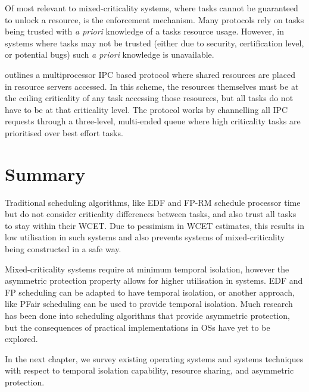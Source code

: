 Of most relevant to mixed-criticality systems, where tasks cannot be guaranteed to unlock a
resource, is the enforcement mechanism.  Many protocols rely on tasks being trusted with \emph{a
priori} knowledge of a tasks resource usage.  However, in systems where tasks may not be trusted
(either due to security, certification level, or potential bugs) such \emph{a priori}
knowledge is unavailable. 

\citet{Brandenburg_14} outlines a multiprocessor \gls{IPC} based protocol where shared resources are placed in
resource servers accessed. In this scheme, the resources themselves must be at the ceiling
criticality of any task accessing those resources, but all tasks do not have to be at that
criticality level. The protocol works by channelling all IPC requests through a three-level,
multi-ended queue where high criticality tasks are prioritised over best effort tasks. 

\section{Summary}


Traditional scheduling algorithms, like \gls{EDF} and \gls{FP}-\gls{RM} schedule processor time but do not consider criticality differences between tasks, and also trust all tasks to stay within their \gls{WCET}.
Due to pessimism in \gls{WCET} estimates, this results in low utilisation in such systems and also prevents systems of mixed-criticality being constructed in a safe way.

Mixed-criticality systems require at minimum temporal isolation, however the asymmetric protection property allows for higher utilisation in systems.
\gls{EDF} and \gls{FP} scheduling can be adapted to have temporal isolation, or another approach, like PFair scheduling can be used to provide temporal isolation.
Much research has been done into scheduling algorithms that provide asymmetric protection, but the consequences of practical implementations in \glspl{OS} have yet to be explored.

In the next chapter, we survey existing operating systems and systems techniques with respect to temporal isolation capability, resource sharing, and asymmetric protection.

